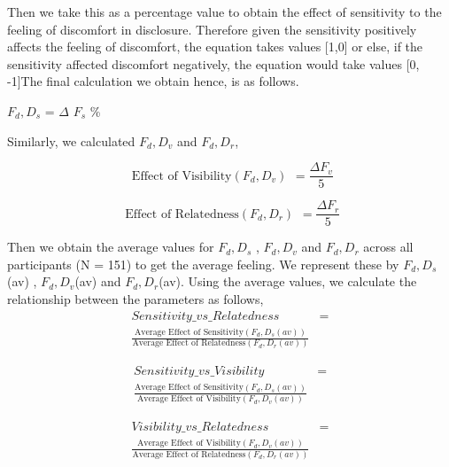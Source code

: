 \documentclass[conference]{IEEEtran}
\begin{document}
Then we take this as a percentage value to obtain the effect of sensitivity to the feeling of discomfort in disclosure. Therefore given the sensitivity positively affects the feeling of discomfort, the equation takes values [1,0] or else, if the sensitivity affected discomfort negatively, the equation would take values [0, -1]The final calculation we obtain hence, is as follows.


$F_d,D_s$ =  $\Delta$ $F_s$ \% 


Similarly, we calculated $F_d,D_v$ and $F_d,D_r$,

\[ \begin{aligned} \text{Effect of Visibility} (F_{d},D_{v}) \end{aligned} =
\frac{\Delta F_{v}}%
 {5}
\]

\[ \begin{aligned} \text{Effect of Relatedness} (F_{d},D_{r})\end{aligned} =
\frac{\Delta F_{r}}%
 {5}
\]

Then we obtain the average values for $F_d,D_s$ , $F_d,D_v$ and $F_d,D_r$ across all participants (N = 151) to get the average feeling. We represent these by $F_d,D_s$(av) , $F_d,D_v$(av) and $F_d,D_r$(av). Using the average values, we calculate the relationship between the parameters as follows,
 \begin{equation} \label{eq1}
\begin{split}
Sensitivity\_vs\_Relatedness & = \\ \frac{\text{Average Effect of Sensitivity}(F_{d},D_{s}(av)) }{\text{Average Effect of Relatedness}(F_{d},D_{r}(av))} 
\end{split}
\end{equation}

 \begin{equation} \label{eq1}
\begin{split}
Sensitivity\_vs\_Visibility & = \\ \frac{\text{Average Effect of Sensitivity}(F_{d},D_{s}(av))}{\text{Average Effect of Visibility}(F_{d},D_{v}(av)) } 
\end{split}
\end{equation}

 \begin{equation} \label{eq1}
\begin{split}
Visibility\_vs\_Relatedness & = \\ \frac{\text{Average Effect of Visibility}(F_{d},D_{v}(av)) }{\text{Average Effect of Relatedness}(F_{d},D_{r}(av))} 
\end{split}
\end{equation}
\end{document}

